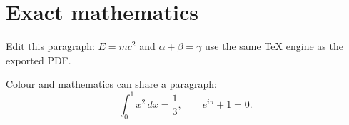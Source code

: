 \documentclass{article}
\begin{document}
\section{Exact mathematics}
Edit this paragraph: $E=mc^2$ and $\alpha+\beta=\gamma$ use the same TeX engine as the exported PDF.

{\color{blue}Colour and mathematics can share a paragraph:}
\[
  \int_0^1 x^2\,dx = \frac{1}{3}, \qquad e^{i\pi}+1=0.
\]
\end{document}
